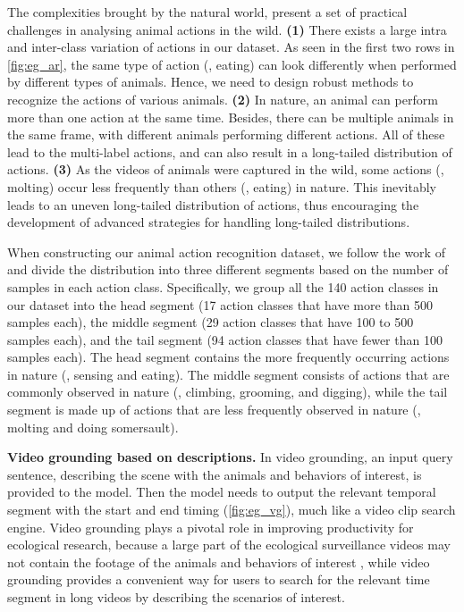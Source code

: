 \documentclass[10pt,twocolumn,letterpaper]{article}
\begin{document}
    
    \label{subsection:long-tail}
    The complexities brought by the natural world, present a set of practical challenges in analysing animal actions in the wild. 
    \textbf{(1)} There exists a large intra and inter-class variation of actions in our dataset. As seen in the first two rows in \cref{fig:eg_ar}, the same type of action (\eg, eating) can look differently when performed by different types of animals. Hence, we need to design robust methods to recognize the actions of various animals. 
    \textbf{(2)} In nature, an animal can perform more than one action at the same time. Besides, there can be multiple animals in the same frame, with different animals performing different actions. All of these lead to the multi-label actions, and can also result in a long-tailed distribution of actions. 
    \textbf{(3)} As the videos of animals were captured in the wild, some actions (\eg, molting) occur less frequently than others (\eg, eating) in nature. This inevitably leads to an uneven long-tailed distribution of actions, thus encouraging the development of advanced strategies for handling long-tailed distributions.
    
    When constructing our animal action recognition dataset,
    we follow the work of \cite{zhang2021videolt} and divide the distribution into three different segments based on the number of samples in each action class. Specifically, we group all the 140 action classes in our dataset into the head segment (17 action classes that have more than 500 samples each), the middle segment (29 action classes that have 100 to 500 samples each), and the tail segment (94 action classes that have fewer than 100 samples each). The head segment contains the more frequently occurring actions in nature (\eg, sensing and eating). The middle segment consists of actions that are commonly observed in nature (\eg, climbing, grooming, and digging), while the tail segment is made up of actions that are less frequently observed in nature (\eg, molting and doing somersault).  
    
    \textbf{Video grounding based on descriptions.}
    In video grounding, an input query sentence, describing the scene with the animals and behaviors of interest, is provided to the model. Then the model needs to output the relevant temporal segment with the start and end timing (\cref{fig:eg_vg}), much like a video clip search engine. Video grounding plays a pivotal role in improving productivity for ecological research, because a large part of the ecological surveillance videos may not contain the footage of the animals and behaviors of interest \cite{9522940, miao2021serengeti}, while video grounding provides a convenient way for users to search for the relevant time segment in long videos by describing the scenarios of interest.
    
\end{document}
